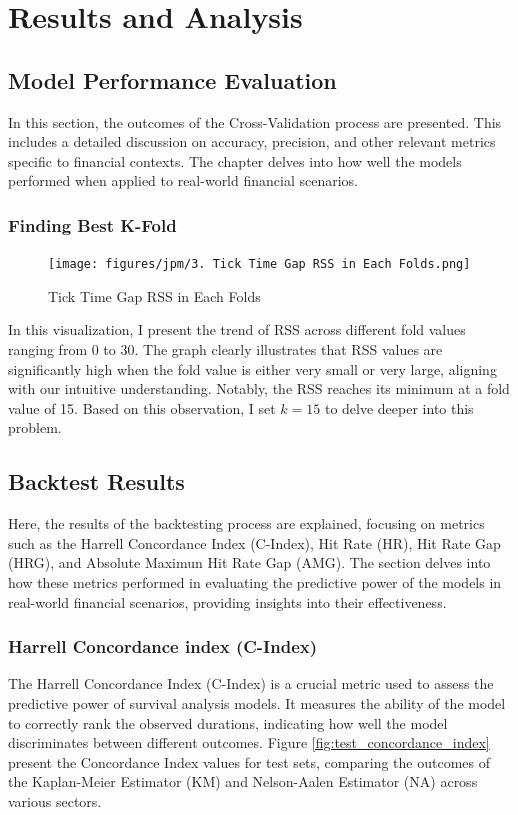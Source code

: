 \chapter{Results and Analysis} \label{Chap5}

\section{Model Performance Evaluation}
In this section, the outcomes of the Cross-Validation process are presented. This includes a detailed discussion on accuracy, precision, and other relevant metrics specific to financial contexts. The chapter delves into how well the models performed when applied to real-world financial scenarios.

\subsection{Finding Best K-Fold} \label{sec:5.1.1}
\begin{figure}[H]
    \centering
    \texttt{[image: figures/jpm/3. Tick Time Gap RSS in Each Folds.png]}
    \caption{Tick Time Gap RSS in Each Folds}
    \label{fig:tick_time_gap_rss}
\end{figure}

In this visualization, I present the trend of RSS across different fold values ranging from 0 to 30. The graph clearly illustrates that RSS values are significantly high when the fold value is either very small or very large, aligning with our intuitive understanding. Notably, the RSS reaches its minimum at a fold value of 15. Based on this observation, I set $k=15$ to delve deeper into this problem.

\section{Backtest Results}
Here, the results of the backtesting process are explained, focusing on metrics such as the Harrell Concordance Index (C-Index), Hit Rate (HR), Hit Rate Gap (HRG), and Absolute Maximun Hit Rate Gap (AMG). The section delves into how these metrics performed in evaluating the predictive power of the models in real-world financial scenarios, providing insights into their effectiveness.

\subsection{Harrell Concordance index (C-Index)}
The Harrell Concordance Index (C-Index) is a crucial metric used to assess the predictive power of survival analysis models. It measures the ability of the model to correctly rank the observed durations, indicating how well the model discriminates between different outcomes. Figure \ref{fig:test_concordance_index} present the Concordance Index values for test sets, comparing the outcomes of the Kaplan-Meier Estimator (KM) and Nelson-Aalen Estimator (NA) across various sectors.

